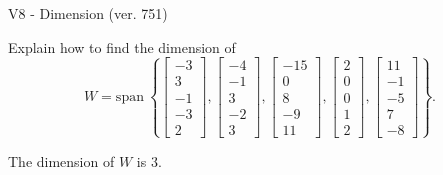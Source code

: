 \begin{exercise}
  \begin{exerciseTitle}V8 - Dimension (ver. 751)\end{exerciseTitle}
  \begin{exerciseStatement}
    Explain how to find the dimension of 
\[W=\mathrm{span}\ \left\{\left[\begin{array}{r}
-3 \\
3 \\
-1 \\
-3 \\
2
\end{array}\right] , \left[\begin{array}{r}
-4 \\
-1 \\
3 \\
-2 \\
3
\end{array}\right] , \left[\begin{array}{r}
-15 \\
0 \\
8 \\
-9 \\
11
\end{array}\right] , \left[\begin{array}{r}
2 \\
0 \\
0 \\
1 \\
2
\end{array}\right] , \left[\begin{array}{r}
11 \\
-1 \\
-5 \\
7 \\
-8
\end{array}\right]\right\}.\]



  \end{exerciseStatement}
  \begin{exerciseAnswer}
   The dimension of \(W\) is  \(3\).
  


  \end{exerciseAnswer}
\end{exercise}